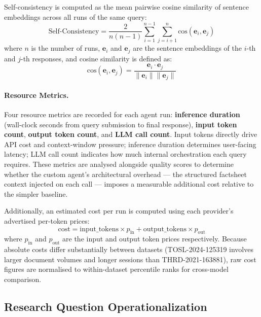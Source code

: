 Self-consistency is computed as the mean pairwise cosine similarity of sentence embeddings across all runs of the same query:
\begin{equation}
    \text{Self-Consistency} = \frac{2}{n(n-1)} \sum_{i=1}^{n-1} \sum_{j=i+1}^{n} \text{cos}(\mathbf{e}_i, \mathbf{e}_j)
\end{equation}
\noindent where $n$ is the number of runs, $\mathbf{e}_i$ and $\mathbf{e}_j$ are the sentence embeddings of the $i$-th and $j$-th responses, and cosine similarity is defined as:
\begin{equation}
    \text{cos}(\mathbf{e}_i, \mathbf{e}_j) = \frac{\mathbf{e}_i \cdot \mathbf{e}_j}{\|\mathbf{e}_i\| \|\mathbf{e}_j\|}
\end{equation}

\paragraph{Resource Metrics.}
Four resource metrics are recorded for each agent run: \textbf{inference duration} (wall-clock seconds from query submission to final response), \textbf{input token count}, \textbf{output token count}, and \textbf{LLM call count}. Input tokens directly drive API cost and context-window pressure; inference duration determines user-facing latency; LLM call count indicates how much internal orchestration each query requires. These metrics are analysed alongside quality scores to determine whether the custom agent's architectural overhead --- the structured factsheet context injected on each call --- imposes a measurable additional cost relative to the simpler baseline.

Additionally, an estimated cost per run is computed using each provider's advertised per-token prices:
\begin{equation*}
    \text{cost} = \text{input\_tokens} \times p_{\text{in}} + \text{output\_tokens} \times p_{\text{out}}
\end{equation*}
where $p_{\text{in}}$ and $p_{\text{out}}$ are the input and output token prices respectively. Because absolute costs differ substantially between datasets (TOSL-2024-125319 involves larger document volumes and longer sessions than THRD-2021-163881), raw cost figures are normalised to within-dataset percentile ranks for cross-model comparison.


\subsection{Research Question Operationalization}
\label{sec:rq-operationalization}

